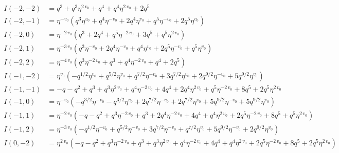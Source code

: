 \documentclass{article}
\begin{document}

\begin{align*}
I(-2, -2) &= q^{3} + q^{3} \eta^{2 \, v_{0}} + q^{4} + q^{4} \eta^{2 \, v_{0}} + 2 q^{5} \\
I(-2, -1) &= \eta^{-v_{0}} \left( q^{3} \eta^{v_{0}} + q^{4} \eta^{-v_{0}} + 2 q^{4} \eta^{v_{0}} + q^{5} \eta^{-v_{0}} + 2 q^{5} \eta^{v_{0}} \right) \\
I(-2, 0) &= \eta^{-2 \, v_{0}} \left( q^{3} + 2 q^{4} + q^{5} \eta^{-2 \, v_{0}} + 3 q^{5} + q^{5} \eta^{2 \, v_{0}} \right) \\
I(-2, 1) &= \eta^{-3 \, v_{0}} \left( q^{3} \eta^{-v_{0}} + 2 q^{4} \eta^{-v_{0}} + q^{4} \eta^{v_{0}} + 2 q^{5} \eta^{-v_{0}} + q^{5} \eta^{v_{0}} \right) \\
I(-2, 2) &= \eta^{-4 \, v_{0}} \left( q^{3} \eta^{-2 \, v_{0}} + q^{3} + q^{4} \eta^{-2 \, v_{0}} + q^{4} + 2 q^{5} \right) \\
I(-1, -2) &= \eta^{v_{0}} \left( -q^{1/2} \eta^{v_{0}} + q^{5/2} \eta^{v_{0}} + q^{7/2} \eta^{-v_{0}} + 3 q^{7/2} \eta^{v_{0}} + 2 q^{9/2} \eta^{-v_{0}} + 5 q^{9/2} \eta^{v_{0}} \right) \\
I(-1, -1) &= -q - q^{2} + q^{3} + q^{3} \eta^{2 \, v_{0}} + q^{4} \eta^{-2 \, v_{0}} + 4 q^{4} + 2 q^{4} \eta^{2 \, v_{0}} + q^{5} \eta^{-2 \, v_{0}} + 8 q^{5} + 2 q^{5} \eta^{2 \, v_{0}} \\
I(-1, 0) &= \eta^{-v_{0}} \left( -q^{3/2} \eta^{-v_{0}} - q^{3/2} \eta^{v_{0}} + 2 q^{7/2} \eta^{-v_{0}} + 2 q^{7/2} \eta^{v_{0}} + 5 q^{9/2} \eta^{-v_{0}} + 5 q^{9/2} \eta^{v_{0}} \right) \\
I(-1, 1) &= \eta^{-2 \, v_{0}} \left( -q - q^{2} + q^{3} \eta^{-2 \, v_{0}} + q^{3} + 2 q^{4} \eta^{-2 \, v_{0}} + 4 q^{4} + q^{4} \eta^{2 \, v_{0}} + 2 q^{5} \eta^{-2 \, v_{0}} + 8 q^{5} + q^{5} \eta^{2 \, v_{0}} \right) \\
I(-1, 2) &= \eta^{-3 \, v_{0}} \left( -q^{1/2} \eta^{-v_{0}} + q^{5/2} \eta^{-v_{0}} + 3 q^{7/2} \eta^{-v_{0}} + q^{7/2} \eta^{v_{0}} + 5 q^{9/2} \eta^{-v_{0}} + 2 q^{9/2} \eta^{v_{0}} \right) \\
I(0, -2) &= \eta^{2 \, v_{0}} \left( -q - q^{2} + q^{3} \eta^{-2 \, v_{0}} + q^{3} + q^{3} \eta^{2 \, v_{0}} + q^{4} \eta^{-2 \, v_{0}} + 4 q^{4} + q^{4} \eta^{2 \, v_{0}} + 2 q^{5} \eta^{-2 \, v_{0}} + 8 q^{5} + 2 q^{5} \eta^{2 \, v_{0}} \right) \\

\end{align*}
\end{document}
